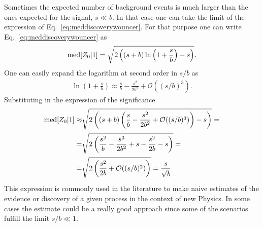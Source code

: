 \documentclass[12pt,a4paper]{article}
\begin{document}
Sometimes the expected number of background events is much larger than the ones expected for the signal, $s\ll b$. In that case one can take the limit of the expression of Eq.~\eqref{eq:meddiscoverywouncer}. For that purpose one can write Eq.~\eqref{eq:meddiscoverywouncer} as 
\begin{align}
{\rm med}[Z_0|1]=\sqrt{2\left((s+b)\ln\left(1+\frac{s}{b}\right)-s\right)}.
\end{align}
One can easily expand the logarithm at second order in $s/b$ as
\begin{align}
\ln\left(1+\frac{s}{b}\right)\approx \frac{s}{b} -\frac{s^2}{2b^2}+ \mathcal{O}((s/b)^3).
\end{align}
Substituting in the expression of the significance
\begin{align}
{\rm med}[Z_0|1]\approx &\sqrt{2\left((s+b)\left(\frac{s}{b} -\frac{s^2}{2b^2}+ \mathcal{O}((s/b)^3)\right)-s\right)}=\notag\\
 =&\sqrt{2\left(\frac{s^2}{b}-\frac{s^3}{2b^2}+s-\frac{s^2}{2b}-s\right)}=\notag\\
 =&\sqrt{2\left(\frac{s^2}{2b}+\mathcal{O}((s/b)^2)\right)}=\frac{s}{\sqrt{b}}. \label{eq:sigsimp}
\end{align}
This expression is commonly used in the literature to make naive estimates of the evidence or discovery of a given process in the context of new Physics. In some cases the estimate could be a really good approach since some of the scenarios fulfill the limit $s/b\ll 1$.
\end{document}
